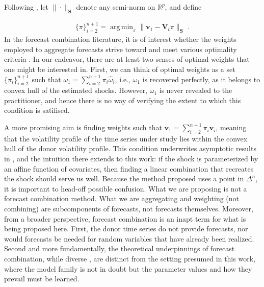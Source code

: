 \documentclass[11pt,3p,review,authoryear]{elsarticle}
\newcommand{\weight}{\pi}
\newcommand{\V}{\textbf{V}}
\DeclareMathOperator*{\argmin}{arg\,min} %
\theoremstyle{definition}
\begin{document}
    Following \citet{abadie2003economic,abadie2010synthetic}, let $\|\cdot\|_{\textbf{S}}$ denote any semi-norm on $\mathbb{R}^{p}$, and define

    \begin{align*}
    \{\pi\}_{i=2}^{n+1} = \argmin_{\pi}\|\textbf{v}_{1} - \V_{t}\pi \|_{\textbf{S}} \text{ .}
    \end{align*}
In the forecast combination literature, it is of interest whether the weights employed to aggregate forecasts strive toward and meet various optimality criteria \citep{timmermann2006forecast,wang2023forecast}.  In our endeavor, there are at least two senses of optimal weights that one might be interested in.  First, we can think of optimal weights as a set $\{\weight_{i}\}_{i=2}^{n+1}$ such that $\omega_{1} = \sum^{n+1}_{i=2}\weight_{i}\hat\omega_{i}$, i.e., $\omega_{1}$ is recovered perfectly, as it belongs to convex hull of the estimated shocks. However, $\omega_{1}$ is never revealed to the practitioner, and hence there is no way of verifying the extent to which this condition is satifised.

A more promising aim is finding weights such that $\textbf{v}_{1} = \sum^{n+1}_{i=2}\weight_{i}\textbf{v}_{i}$, meaning that the volatility profile of the time series under study lies within the convex hull of the donor volatility profile.  This condition underwrites asymptotic results in \citet{abadie2010synthetic}, and the intuition there extends to this work: if the shock is parameterized by an affine function of covariates, then finding a linear combination that recreates the shock should serve us well.  Because the method proposed uses a point in $\Delta^{n}$, it is important to head-off possible confusion.  What we are proposing is not a forecast combination method.  What we are aggregating and weighting (not combining) are subcomponents of forecasts, not forecasts themselves.  Moreover, from a broader perspective, forecast combination is an inapt term for what is being proposed here.  First, the donor time series do not provide forecasts, nor would forecasts be needed for random variables that have already been realized.  Second and more fundamentally, the theoretical underpinnings of forecast combination, while diverse \citep{wang2023forecast}, are distinct from the setting presumed in this work, where the model family is not in doubt but the parameter values and how they prevail must be learned.
\end{document}

